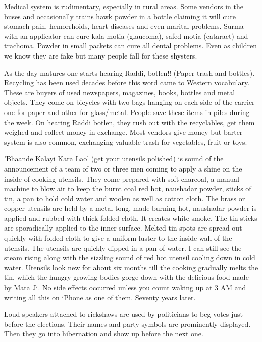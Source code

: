 Medical system is rudimentary, especially in rural areas. Some vendors in
the buses and occasionally trains hawk powder in a bottle claiming it will
cure stomach pain, hemorrhoids, heart diseases and even marital problems.
Surma with an applicator can cure kala motia (glaucoma), safed motia
(cataract) and trachoma. Powder in small packets can cure all dental
problems. Even as children we know they are fake but many people fall for
these shysters. 

As the day matures one starts hearing Raddi, botlen!! (Paper trash and
bottles). Recycling has been used decades before this word came to Western
vocabulary. These are buyers of used newspapers, magazines, books, bottles
and metal objects. They come on bicycles with two bags hanging on each
side of the carrier-one for paper and other for glass/metal. People save
these items in piles during the week. On hearing Raddi botlen, they rush
out with the recyclables, get them weighed and collect money in exchange.
Most vendors give money but barter system is also common, exchanging
valuable trash for vegetables, fruit or toys. 

'Bhaande Kalayi Kara Lao' (get your utensils polished) is sound of the
announcement of a team of two or three men coming to apply a shine on the
inside of cooking utensils. They come prepared with soft charcoal,
a manual machine to blow air to keep the burnt coal red hot, naushadar
powder, sticks of tin, a pan to hold cold water and woolen as well as
cotton cloth. The brass or copper utensils are held by a metal tong, made
burning hot, naushadar powder is applied and rubbed with thick folded
cloth. It creates white smoke. The tin sticks are sporadically applied to
the inner surface. Melted tin spots are spread out quickly with folded
cloth to give a uniform luster to the inside wall of the utensils. The
utensils are quickly dipped in a pan of water. I can still see the steam
rising along with the sizzling sound of red hot utensil cooling down in
cold water. Utensils look new for about six months till the cooking
gradually melts the tin, which the hungry growing bodies gorge down with
the delicious food made by Mata Ji. No side effects occurred unless you
count waking up at 3 AM and writing all this on iPhone as one of them.
Seventy years later. 

Loud speakers attached to rickshaws are used by politicians to beg votes
just before the elections. Their names and party symbols are prominently
displayed. Then they go into hibernation and show up before the next one. 

